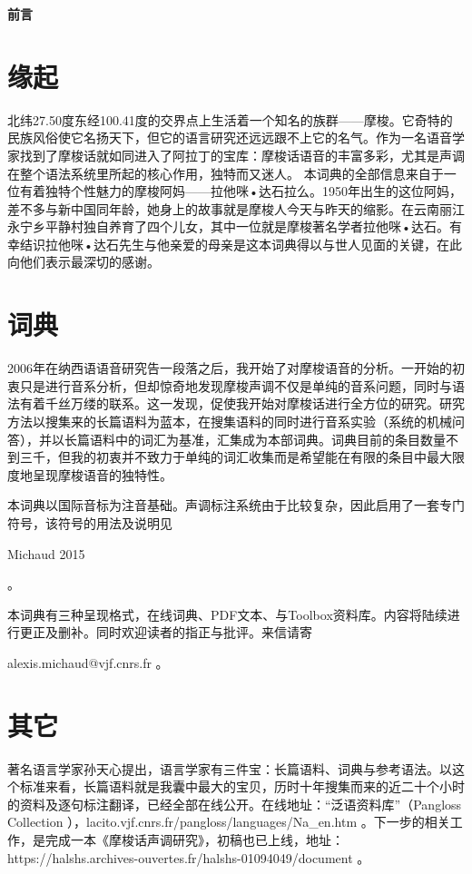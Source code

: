 \documentclass[oldfontcommands,oneside,a4paper,11pt]{article}
\newcommand{\zh}[1]{{\cn #1}}
\begin{document}
	{\LARGE \textbf{\zh{前言}}}
	\section{ \zh{缘起}} \label{sec:language}
	
	\zh{北纬27.50度东经100.41度的交界点上生活着一个知名的族群——摩梭。它奇特的民族风俗使它名扬天下，但它的语言研究还远远跟不上它的名气。作为一名语音学家找到了摩梭话就如同进入了阿拉丁的宝库：摩梭话语音的丰富多彩，尤其是声调在整个语法系统里所起的核心作用，独特而又迷人。
		本词典的全部信息来自于一位有着独特个性魅力的摩梭阿妈——拉他咪•达石拉么。1950年出生的这位阿妈，差不多与新中国同年龄，她身上的故事就是摩梭人今天与昨天的缩影。在云南丽江永宁乡平静村独自养育了四个儿女，其中一位就是摩梭著名学者拉他咪•达石。有幸结识拉他咪•达石先生与他亲爱的母亲是这本词典得以与世人见面的关键，在此向他们表示最深切的感谢。}
	
	\section{ \zh{词典}} \label{sec:method}
	
	\zh{2006年在纳西语语音研究告一段落之后，我开始了对摩梭语音的分析。一开始的初衷只是进行音系分析，但却惊奇地发现摩梭声调不仅是单纯的音系问题，同时与语法有着千丝万缕的联系。这一发现，促使我开始对摩梭话进行全方位的研究。研究方法以搜集来的长篇语料为蓝本，在搜集语料的同时进行音系实验（系统的机械问答），并以长篇语料中的词汇为基准，汇集成为本部词典。词典目前的条目数量不到三千，但我的初衷并不致力于单纯的词汇收集而是希望能在有限的条目中最大限度地呈现摩梭语音的独特性。
		
		本词典以国际音标为注音基础。声调标注系统由于比较复杂，因此启用了一套专门符号，该符号的用法及说明见}Michaud 2015\zh{。
		
		本词典有三种呈现格式，在线词典、PDF文本、与Toolbox资料库。内容将陆续进行更正及删补。同时欢迎读者的指正与批评。来信请寄}alexis.michaud@vjf.cnrs.fr \zh{。}
	
	\section{ \zh{其它}} \label{sec:other}
	
	\zh{著名语言学家孙天心提出，语言学家有三件宝：长篇语料、词典与参考语法。以这个标准来看，长篇语料就是我囊中最大的宝贝，历时十年搜集而来的近二十个小时的资料及逐句标注翻译，已经全部在线公开。在线地址：“泛语资料库”（}Pangloss Collection \zh{），}lacito.vjf.cnrs.fr/pangloss/languages/Na\_en.htm \zh{。下一步的相关工作，是完成一本《摩梭话声调研究》，初稿也已上线，地址：}https://halshs.archives-ouvertes.fr/halshs-01094049/document \zh{。}
	
\end{document}
